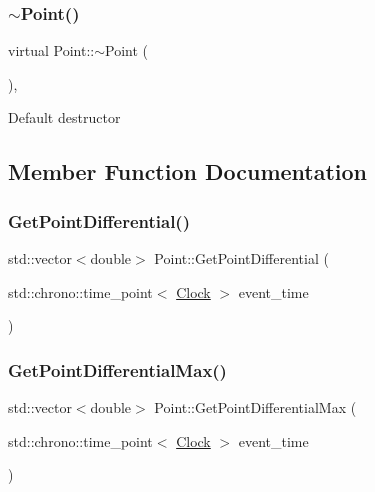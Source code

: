 \mbox{\label{classPoint_a364091762d6aa1aa5983d36fd7d8b6d5}} 
\subsubsection{\texorpdfstring{$\sim$\+Point()}{~Point()}}
{\footnotesize\ttfamily virtual Point\+::$\sim$\+Point (\begin{DoxyParamCaption}{ }\end{DoxyParamCaption})\hspace{0.3cm}{\ttfamily [inline]}, {\ttfamily [virtual]}}

Default destructor 

\subsection{Member Function Documentation}
\mbox{\label{classPoint_af3941d62b39234e468e201f25a37d9da}} 
\subsubsection{\texorpdfstring{Get\+Point\+Differential()}{GetPointDifferential()}}
{\footnotesize\ttfamily std\+::vector$<$double$>$ Point\+::\+Get\+Point\+Differential (\begin{DoxyParamCaption}\item[{std\+::chrono\+::time\+\_\+point$<$ \mbox{\hyperlink{universe_8h_a0ef8d951d1ca5ab3cfaf7ab4c7a6fd80}{Clock}} $>$}]{event\+\_\+time }\end{DoxyParamCaption})\hspace{0.3cm}{\ttfamily [inline]}}

\mbox{\label{classPoint_a326cd5742e908f8fb3cf6f3275b5462c}} 
\subsubsection{\texorpdfstring{Get\+Point\+Differential\+Max()}{GetPointDifferentialMax()}}
{\footnotesize\ttfamily std\+::vector$<$double$>$ Point\+::\+Get\+Point\+Differential\+Max (\begin{DoxyParamCaption}\item[{std\+::chrono\+::time\+\_\+point$<$ \mbox{\hyperlink{universe_8h_a0ef8d951d1ca5ab3cfaf7ab4c7a6fd80}{Clock}} $>$}]{event\+\_\+time }\end{DoxyParamCaption})\hspace{0.3cm}{\ttfamily [inline]}}

